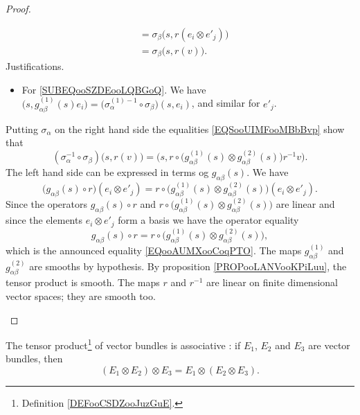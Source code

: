 \begin{proof}
\begin{subproof}
\begin{subproof}
\begin{subequations}
\begin{align}
					 & =\sigma_{\beta}\big( s,r(e_i\otimes e'_j) \big)                                                                                                                                        \\
					 & =\sigma_{\beta}\big( s,r(v) \big).
				\end{align}
			\end{subequations}
			Justifications.
			\begin{itemize}
				\item
				      For \eqref{SUBEQooSZDEooLQBGoQ}. We have \( \big( s,g_{\alpha\beta}^{(1)}(s)e_i \big)=\big( \sigma_{\alpha}^{(1)-1}\circ \sigma_{\beta} \big)(s,e_i)\), and similar for \( e'_j\).
			\end{itemize}
			Putting \( \sigma_{\alpha}\) on the right hand side the equalities \eqref{EQSooUIMFooMBbBvp} show that
			\begin{equation}
				(\sigma_{\alpha}^{-1}\circ \sigma_{\beta})\big( s,r(v) \big)=\Big( s,r\circ\big( g_{\alpha\beta}^{(1)}(s)\otimes g_{\alpha\beta}^{(2)}(s) \big)r^{-1}v \Big).
			\end{equation}
			The left hand side can be expressed in terms og \( g_{\alpha\beta}(s)\). We have
			\begin{equation}
				\big( g_{\alpha\beta}(s)\circ r \big)(e_i\otimes e'_j)=r\circ \big( g_{\alpha\beta}^{(1)}(s)\otimes g_{\alpha\beta}^{(2)}(s) \big)(e_i\otimes e'_j).
			\end{equation}
			Since the operators \( g_{\alpha\beta}(s)\circ r\) and \( r\circ\big(   g_{\alpha\beta}^{(1)}(s)\otimes g_{\alpha\beta}^{(2)}(s) \big)\) are linear and since the elements \( e_i\otimes e'_j\) form a basis we have the operator equality
			\begin{equation}
				g_{\alpha\beta}(s)\circ r=r\circ \big( g_{\alpha\beta}^{(1)}(s)\otimes g_{\alpha\beta}^{(2)}(s) \big),
			\end{equation}
			which is the announced equality \eqref{EQooAUMXooCoqPTO}.
			\spitem[Conclusion]
			The maps \( g_{\alpha\beta}^{(1)}\) and \( g_{\alpha\beta}^{(2)}\) are smooths by hypothesis. By proposition \ref{PROPooLANVooKPiLuu}, the tensor product is smooth. The maps \( r\) and \( r^{-1}\) are linear on finite dimensional vector spaces; they are smooth too.
		\end{subproof}
	\end{subproof}
\end{proof}

\begin{proposition}		\label{PROPooEYSWooOeQNyX}
	The tensor product\footnote{Definition \ref{DEFooCSDZooJuzGuE}.} of vector bundles is associative : if \( E_1\), \( E_2\) and \( E_3\) are vector bundles, then
	\begin{equation}
		(E_1\otimes E_2)\otimes E_3=E_1\otimes (E_2\otimes E_3).
	\end{equation}
\end{proposition}


